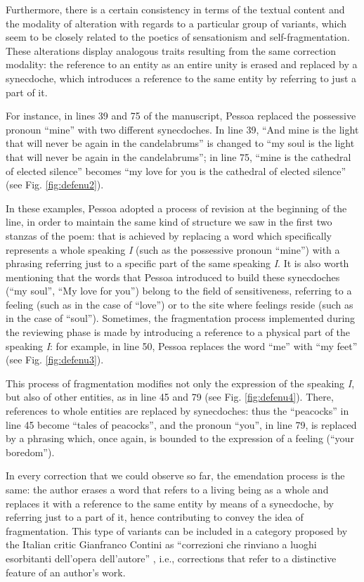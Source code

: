 \begin{paper}
Furthermore, there is a certain consistency in terms of the textual
content and the modality of alteration with regards to a particular
group of variants, which seem to be closely related to the poetics of
sensationism and self-fragmentation. These alterations display analogous
traits resulting from the same correction modality: the reference to an
entity as an entire unity is erased and replaced by a synecdoche, which
introduces a reference to the same entity by referring to just a part of
it.

For instance, in lines 39 and 75 of the manuscript, Pessoa replaced the
possessive pronoun ``mine'' with two different synecdoches. In line 39,
``And mine is the light that will never be again in the candelabrums''
is changed to ``my soul is the light that will never be again in the
candelabrums''; in line 75, ``mine is the cathedral of elected silence''
becomes ``my love for you is the cathedral of elected
silence'' (see Fig. \ref{fig:defenu2}).

In these examples, Pessoa adopted a process of revision at the beginning of the line, in order to
maintain the same kind of structure we
saw in the first two stanzas of the poem: that is achieved by replacing
a word which specifically represents a whole speaking \emph{I} (such as
the possessive pronoun ``mine'') with a phrasing referring just to a
specific part of the same speaking \emph{I}. It is also worth mentioning
that the words that Pessoa introduced to build these synecdoches (``my
soul'', ``My love for you'') belong to the field of sensitiveness,
referring to a feeling (such as in the case of ``love'') or to the site
where feelings reside (such as in the case of ``soul''). Sometimes, the fragmentation process implemented during the reviewing
phase is made by introducing  a reference to a physical part
of the speaking \emph{I}: for example, in line 50, Pessoa replaces the
word ``me'' with ``my feet'' (see Fig. \ref{fig:defenu3}).

This process of fragmentation modifies not only the expression of the
speaking \emph{I}, but also of other entities, as in line 45
and 79 (see Fig. \ref{fig:defenu4}). There, references to whole entities are replaced by synecdoches: thus the
``peacocks'' in line 45 become ``tales of peacocks'', and the pronoun
``you'', in line 79, is replaced by a phrasing which, once again, is
bounded to the expression of a feeling (``your boredom'').

In every correction that we could observe so far, the emendation process
is the same: the author erases a word that refers to a living being as a
whole and replaces it with a reference to the same entity by means of a
synecdoche, by referring just to a part of it, hence contributing to
convey the idea of fragmentation. This type of variants can be included in a category proposed by the
Italian critic Gianfranco Contini as ``correzioni che rinviano a luoghi
esorbitanti dell'opera dell'autore'' \parencite[72]{contini_esercizi_1974}, i.e., corrections that
refer to a distinctive feature of an author's work.


\end{paper}
